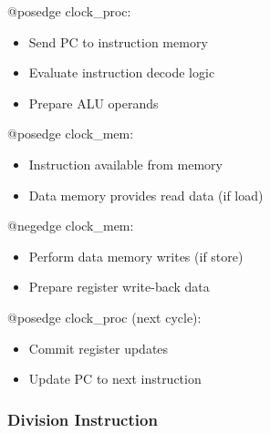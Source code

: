 \documentclass[a4paper, 11pt]{article}
\begin{document}
\begin{algorithm}[H]
\DontPrintSingleQuotedStrings
\DontPrintSemicolon

@posedge clock\_proc:
\begin{itemize}
    \item Send PC to instruction memory
    \item Evaluate instruction decode logic
    \item Prepare ALU operands
\end{itemize}

@posedge clock\_mem:
\begin{itemize}
    \item Instruction available from memory
    \item Data memory provides read data (if load)
\end{itemize}

@negedge clock\_mem:
\begin{itemize}
    \item Perform data memory writes (if store)
    \item Prepare register write-back data
\end{itemize}

@posedge clock\_proc (next cycle):
\begin{itemize}
    \item Commit register updates
    \item Update PC to next instruction
\end{itemize}

\caption{Non-Division Instruction Timing}
\end{algorithm}

\subsubsection{Division Instruction}
\end{document}
